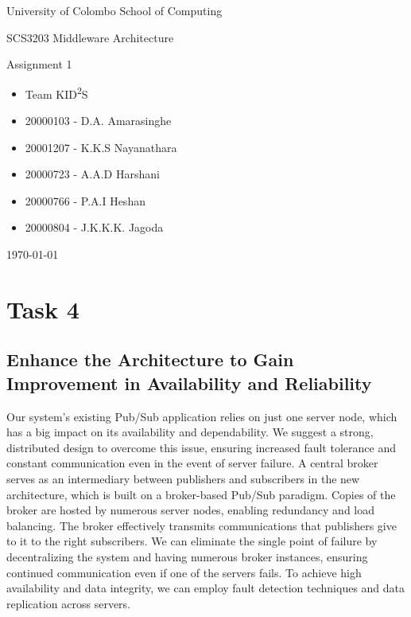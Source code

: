 \documentclass[12pt]{article}
\newcommand{\courseUniversity}{University of Colombo School of Computing}
\newcommand{\courseName}{SCS3203 Middleware Architecture}
\newcommand{\assignmentTitle}{Assignment 1}
\newcommand{\studentInfo}{
\begin{itemize}[label={}, noitemsep]
\item \hspace{5cm} Team KID\textsuperscript{2}S
\vspace*{0.5cm}
\item \hspace{3cm} 20000103 - D.A. Amarasinghe 
\item \hspace{3cm} 20001207 - K.K.S Nayanathara
\item \hspace{3cm} 20000723 - A.A.D Harshani
\item \hspace{3cm} 20000766 - P.A.I Heshan
\item \hspace{3cm} 20000804 - J.K.K.K. Jagoda
\end{itemize}
}
\begin{document}
\begin{titlepage}
    \centering
    \vspace*{1cm}
    {\LARGE \courseUniversity \par}
    \vspace{1.5cm}
    {\Large \courseName \par}
    \vspace{1cm}
    {\Large \assignmentTitle \par}
    \vspace{2cm}
    {\large \studentInfo \par}
    \vfill
    {\large \today \par}
\end{titlepage}

\setcounter{page}{1}

\section*{Task 4}

\subsection*{Enhance the Architecture to Gain Improvement in Availability and Reliability\\}

Our system's existing Pub/Sub application relies on just one server node, which has a big impact on its availability and dependability. We suggest a strong, distributed design to overcome this issue, ensuring increased fault tolerance and constant communication even in the event of server failure. A central broker serves as an intermediary between publishers and subscribers in the new architecture, which is built on a broker-based Pub/Sub paradigm. Copies of the broker are hosted by numerous server nodes, enabling redundancy and load balancing. The broker effectively transmits communications that publishers give to it to the right subscribers. We can eliminate the single point of failure by decentralizing the system and having numerous broker instances, ensuring continued communication even if one of the servers fails. To achieve high availability and data integrity, we can employ fault detection techniques and data replication across servers.\\
\end{document}
